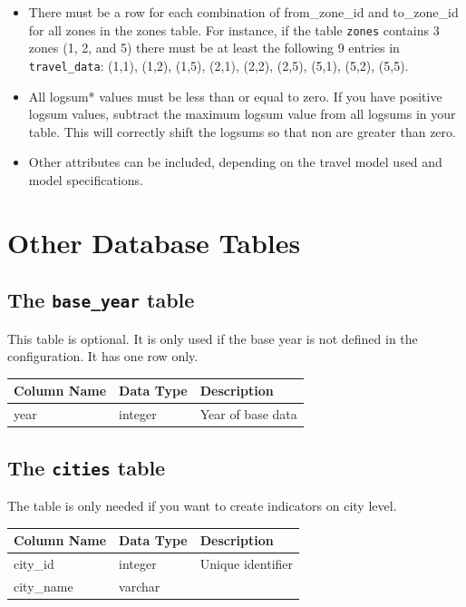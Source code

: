 \begin{itemize} \tight
\item There must be a row for each combination of from_zone_id and to_zone_id
for all zones in the zones table. For instance, if the table \verb|zones| contains 3 zones (1,
2, and 5) there must be at least the following 9 entries in \verb|travel_data|:
(1,1), (1,2), (1,5), (2,1), (2,2), (2,5), (5,1), (5,2), (5,5). 
\item All logsum* values must be less than or equal to zero. If you have positive logsum values, subtract the maximum logsum value from all
logsums in your table. This will correctly shift the logsums so that non are
greater than zero.
\item Other attributes can be included, depending on the travel model used and model specifications.
\end{itemize}


\section{Other Database Tables}
\label{sec:other-db-tables}


\subsection{The {\tt base_year} table}

This table is optional. It is only used if the base year is not defined in the configuration.
It has one row only.

\begin{tabular}{lll}
\textbf{Column Name} & \textbf{Data Type} & \textbf{Description} \\
\hline
year & integer & Year of base data  \\
\hline
\end{tabular}


\subsection{The {\tt cities} table}

The table is only needed if you want to create indicators on city level. 

\begin{tabular}{lll}
\textbf{Column Name} & \textbf{Data Type} & \textbf{Description} \\
\hline
city_id & integer & Unique identifier  \\
\hline
city_name & varchar & \\
\hline
\end{tabular}

